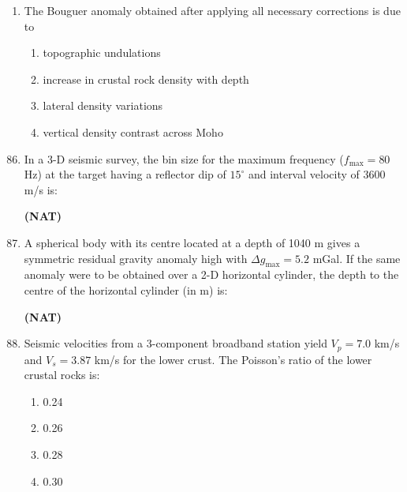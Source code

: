 \documentclass[journal,12pt,onecolumn]{IEEEtran}
\theoremstyle{remark}
\begin{document}
\begin{enumerate}
\item The Bouguer anomaly obtained after applying all necessary corrections is due to

\begin{enumerate}
\item topographic undulations  
\item increase in crustal rock density with depth  
\item lateral density variations  
\item vertical density contrast across Moho  
\end{enumerate}


\end{enumerate}

\begin{enumerate}
\setcounter{enumi}{85}

\item In a 3-D seismic survey, the bin size for the maximum frequency ($f_{\text{max}} = 80$ Hz) at the target having a reflector dip of $15^\circ$ and interval velocity of $3600$ m/s is:

\textbf{(NAT)} \underline{\hspace{2cm}}

\vspace{0.5cm}

\item A spherical body with its centre located at a depth of 1040 m gives a symmetric residual gravity anomaly high with $\Delta g_{\text{max}} = 5.2$ mGal. If the same anomaly were to be obtained over a 2-D horizontal cylinder, the depth to the centre of the horizontal cylinder (in m) is:

\textbf{(NAT)} \underline{\hspace{2cm}}

\vspace{0.5cm}

\item Seismic velocities from a 3-component broadband station yield $V_p = 7.0$ km/s and $V_s = 3.87$ km/s for the lower crust. The Poisson's ratio of the lower crustal rocks is:

\begin{multicols}{4}
\begin{enumerate}
\item 0.24  
\item 0.26  
\item 0.28  
\item 0.30  
\end{enumerate}
\end{multicols}


\end{enumerate}
\end{document}
